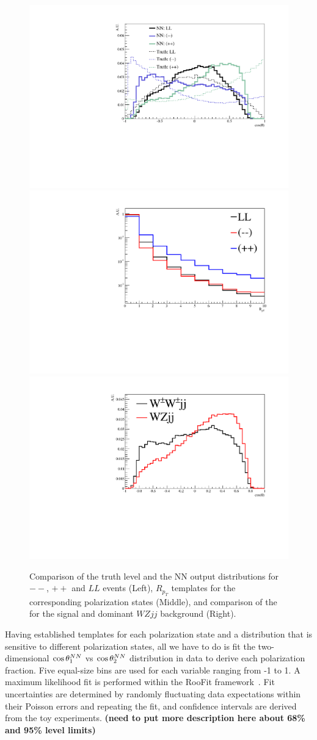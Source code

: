\begin{figure}
\includegraphics[width=.32\textwidth]{./fig/1d_templates_graph_X.pdf}
\includegraphics[width=.32\textwidth]{./fig/ratios_LLRROO_graph.pdf}
\includegraphics[width=.32\textwidth]{./fig/1d_wz_bg_graph_X.pdf}
\caption{\label{fig:polarization_comparison} Comparison of the truth level \cts and the 
NN output \ctsNN distributions for $--$, $++$ and $LL$ events (Left), 
$R_{p_T}$ templates for the corresponding polarization states (Middle), 
and comparison of the \ctsNN for the signal and dominant $WZjj$ background (Right).}
\end{figure}

Having established templates for each polarization state and a
distribution that is sensitive to different polarization states, all
we have to do is fit the two-dimensional $ \cos \theta^{NN}  _1$ vs $ \cos \theta^{NN}  _2$
distribution in data to derive each polarization fraction. Five equal-size bins 
are used for each \ctsNN variable ranging from -1 to 1. A maximum likelihood fit is performed 
within the RooFit framework~\cite{aa}. Fit uncertainties are determined by randomly
fluctuating data expectations within their Poisson errors and
repeating the fit, and confidence intervals are derived from the toy experiments.  
{\bf (need to put more description here about 68\% and 95\% level limits)}

